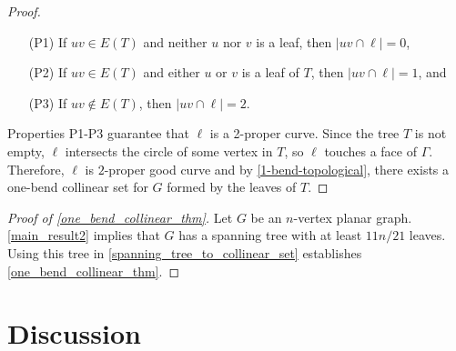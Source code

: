 \documentclass{article}
\newtheorem{thm}{Theorem}
\theoremstyle{definition}
\begin{document}
\begin{proof}
    \begin{enumerate}
        \item [(P1)] If $uv \in E(T)$ and neither $u$ nor $v$ is a leaf, then $|uv \cap \ell| = 0$,

        \item [(P2)] If $uv \in E(T)$ and either $u$ or $v$ is a leaf of $T$, then $|uv \cap \ell| = 1$, and

        \item [(P3)] If $uv \notin E(T)$, then $|uv \cap \ell| = 2$.
    \end{enumerate}

    Properties P1-P3 guarantee that $\ell$ is a 2-proper curve. Since the tree $T$ is not empty, $\ell$ intersects the circle of some vertex in $T$, so $\ell$ touches a face of $\Gamma$. Therefore, $\ell$ is $2$-proper good curve and by \cref{1-bend-topological}, there exists a one-bend collinear set for $G$ formed by the leaves of $T$.
\end{proof}

\begin{proof}[Proof of \cref{one_bend_collinear_thm}]
Let $G$ be an $n$-vertex planar graph. \cref{main_result2} implies that $G$ has a spanning tree with at least $11n/21$ leaves. Using this tree in \cref{spanning_tree_to_collinear_set} establishes \cref{one_bend_collinear_thm}.
\end{proof}

\section{Discussion}



\end{document}
